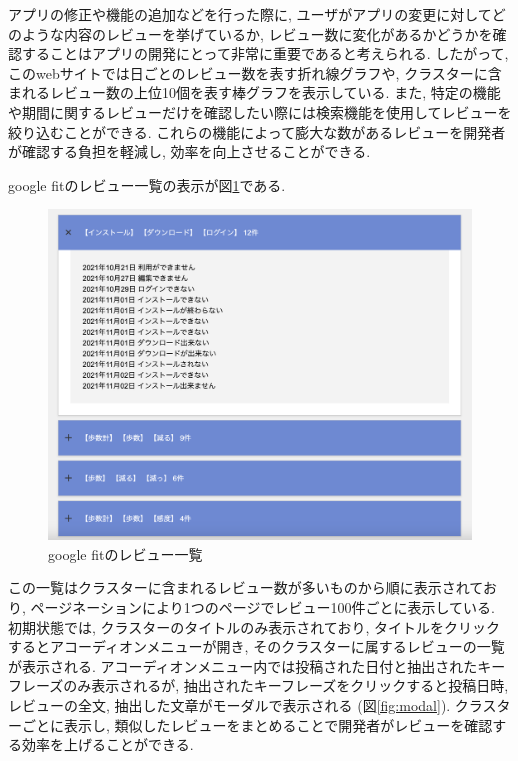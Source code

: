 アプリの修正や機能の追加などを行った際に, ユーザがアプリの変更に対してどのような内容のレビューを挙げているか, レビュー数に変化があるかどうかを確認することはアプリの開発にとって非常に重要であると考えられる. 
したがって, このwebサイトでは日ごとのレビュー数を表す折れ線グラフや, クラスターに含まれるレビュー数の上位10個を表す棒グラフを表示している. 
また, 特定の機能や期間に関するレビューだけを確認したい際には検索機能を使用してレビューを絞り込むことができる. 
これらの機能によって膨大な数があるレビューを開発者が確認する負担を軽減し, 効率を向上させることができる. 

google fitのレビュー一覧の表示が図\ref{fig:review_items}である. 

\begin{figure}[H]
  \centering
  \includegraphics[scale=0.3]
    {contents/images/review_items.png}
  \caption{google fitのレビュー一覧\label{fig:review_items}}
\end{figure}

この一覧はクラスターに含まれるレビュー数が多いものから順に表示されており, ページネーションにより1つのページでレビュー100件ごとに表示している. 
初期状態では, クラスターのタイトルのみ表示されており, タイトルをクリックするとアコーディオンメニューが開き, そのクラスターに属するレビューの一覧が表示される. アコーディオンメニュー内では投稿された日付と抽出されたキーフレーズのみ表示されるが, 抽出されたキーフレーズをクリックすると投稿日時, レビューの全文, 抽出した文章がモーダルで表示される (図\ref{fig:modal}). 
クラスターごとに表示し, 類似したレビューをまとめることで開発者がレビューを確認する効率を上げることができる. 

